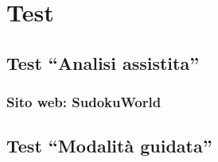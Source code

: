 \chapter{Test}
\label{chap:test}

\section{Test ``Analisi assistita''}
\subsection{Sito web: SudokuWorld}



\section{Test ``Modalità guidata''}